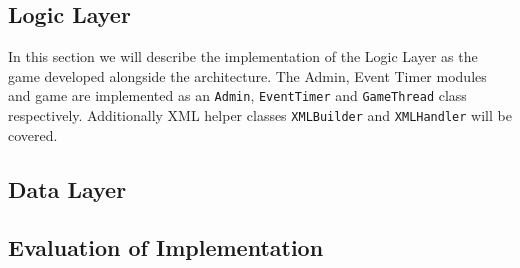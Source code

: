 

\subsection{Logic Layer}
In this section we will describe the implementation of the Logic Layer as the game developed alongside the architecture. The Admin, Event Timer modules and game are implemented as an \texttt{Admin}, \texttt{EventTimer} and \texttt{GameThread} class respectively. Additionally XML helper classes \texttt{XMLBuilder} and \texttt{XMLHandler} will be covered.






\subsection{Data Layer}


\subsection{Evaluation of Implementation}